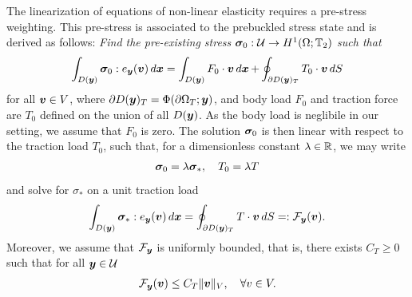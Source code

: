 
The linearization of equations of non-linear elasticity requires a pre-stress weighting. This pre-stress is associated to the prebuckled stress state and is derived as follows:
\emph{Find the pre-existing stress $\boldsymbol{\sigma}_0: \mathcal{U} \to H^1(\Omega;\mathbb{T}_2)$ such that} 
\begin{align}\label{eq:sourceproblem_weak}
    \int_{D({\boldsymbol{y}})} \boldsymbol{\sigma}_0 : e_{\boldsymbol{y}}({\boldsymbol{v}}) \mathop{d\boldsymbol{x}}  =\int_{D({\boldsymbol{y}})}  F_0\cdot  {\boldsymbol{v}} \mathop{d\boldsymbol{x}}  + \oint_{\partial D({\boldsymbol{y}})_T} T_0 \cdot  {\boldsymbol{v}} \mathop{dS}
\end{align}
for all ${\boldsymbol{v}} \in V$, where $\partial D({\boldsymbol{y}})_T = \Phi(\partial \Omega_T; {\boldsymbol{y}})$, and body load $F_0$ and traction force are $T_0$ defined on the union of all $D({\boldsymbol{y}})$. 
As the body load is neglibile in our setting, we assume that $F_0$ is zero. The solution $\boldsymbol{\sigma}_0$ is then linear with respect to the traction load $T_0$, such that, 
for a dimensionless constant $\lambda \in \mathbb{R}$, we may write
\begin{align*}
    \boldsymbol{\sigma}_0= \lambda \boldsymbol{\sigma}_*, \quad T_0 =\lambda T
\end{align*} and solve for $\sigma_*$ on a unit traction load 
\begin{align}\label{eq:sourceproblem_weak_star}
    \int_{D({\boldsymbol{y}})} \boldsymbol{\sigma}_*: e_{\boldsymbol{y}}({\boldsymbol{v}}) \mathop{d\boldsymbol{x}}  =  \oint_{\partial D({\boldsymbol{y}})_T} T \cdot  {\boldsymbol{v}} \mathop{dS}  =: \mathcal{F}_{{\boldsymbol{y}}}({\boldsymbol{v}}) .
\end{align}
Moreover, we assume that $\mathcal{F}_{{\boldsymbol{y}}}$ is uniformly bounded, that is, there exists $C_{T} \geq 0$ such that for all ${\boldsymbol{y}} \in \mathcal{U}$
\begin{align}\label{eq:boundOnTractionLoad}
    \mathcal{F}_{{\boldsymbol{y}}}({\boldsymbol{v}}) \leq C_T \| {\boldsymbol{v}} \|_{V}, \quad \forall v \in V.
\end{align}
